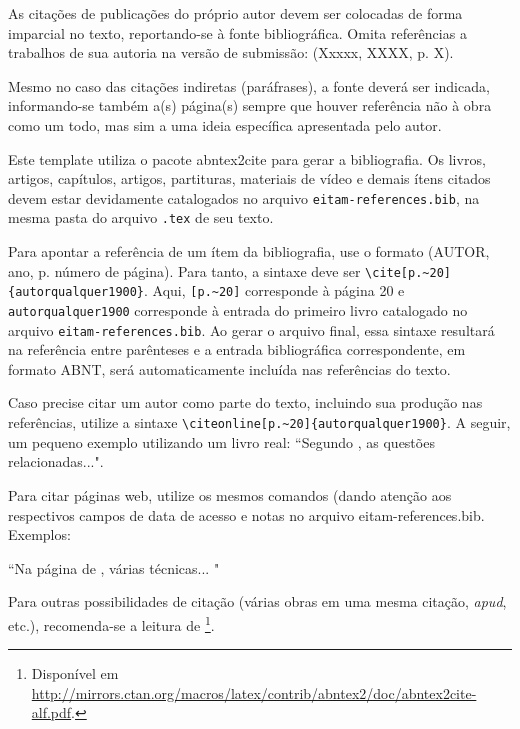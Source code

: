 \documentclass{eitam}
\begin{document}
As citações de publicações do próprio autor devem ser colocadas de forma imparcial no texto, reportando-se à fonte bibliográfica. Omita referências a trabalhos de sua autoria na versão de submissão: (Xxxxx, XXXX, p. X).

Mesmo no caso das citações indiretas (paráfrases), a fonte deverá ser indicada, informando-se também a(s) página(s) sempre que houver referência não à obra como um todo, mas sim a uma ideia específica apresentada pelo autor.

Este template utiliza o pacote abntex2cite para gerar a bibliografia. Os livros, artigos, capítulos, artigos, partituras, materiais de vídeo e demais ítens citados devem estar devidamente catalogados no arquivo \verb!eitam-references.bib!, na mesma pasta do arquivo \verb!.tex! de seu texto.

Para apontar a referência de um ítem da bibliografia, use o formato (AUTOR, ano, p. número de página). Para tanto, a sintaxe deve ser \verb!\cite[p.~20]{autorqualquer1900}!. Aqui, \verb![p.~20]! corresponde à página 20 e \verb!autorqualquer1900! corresponde à entrada do primeiro livro catalogado no arquivo \verb!eitam-references.bib!. Ao gerar o arquivo final, essa sintaxe resultará na referência entre parênteses \cite[p.~20]{autorqualquer1900} e a entrada bibliográfica correspondente, em formato ABNT, será automaticamente incluída nas referências do texto.

Caso precise citar um autor como parte do texto, incluindo sua produção nas referências, utilize a sintaxe \verb!\citeonline[p.~20]{autorqualquer1900}!. A seguir, um pequeno exemplo utilizando um livro real: ``Segundo , as questões relacionadas...".

Para citar páginas web, utilize os mesmos comandos (dando atenção aos respectivos campos de data de acesso e notas no arquivo eitam-references.bib. Exemplos:

``Na página de , várias técnicas... "

Para outras possibilidades de citação (várias obras em uma mesma citação, \emph{apud}, etc.), recomenda-se a leitura de \footnote{ Disponível em \url{http://mirrors.ctan.org/macros/latex/contrib/abntex2/doc/abntex2cite-alf.pdf}.}.

\begingroup
\renewcommand{\section}[2]{\setlength\parindent{0cm} \normalsize \textbf{\color{cinzamed} Referências \vspace{-10pt}}}%
{\small
}
\endgroup
\end{document}
